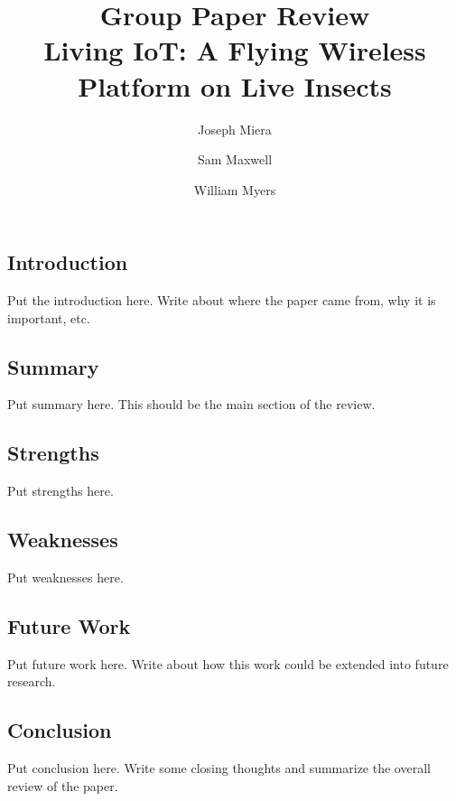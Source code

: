 \documentclass[letterpaper,twocolumn,10pt]{article}
\title{Group Paper Review\\
Living IoT: A Flying Wireless Platform on Live Insects}
\author{Joseph Miera}
\author{Sam Maxwell}
\author{William Myers}
\affil{Brigham Young University}
\begin{document}
\maketitle

\subsection*{Introduction}

Put the introduction here. Write about where the paper came from, why it is important, etc.

\subsection*{Summary}

Put summary here. This should be the main section of the review.

\subsection*{Strengths}

Put strengths here.

\subsection*{Weaknesses}

Put weaknesses here.

\subsection*{Future Work}

Put future work here. Write about how this work could be extended into future research.

\subsection*{Conclusion}

Put conclusion here. Write some closing thoughts and summarize the overall review of the paper.
\end{document}
